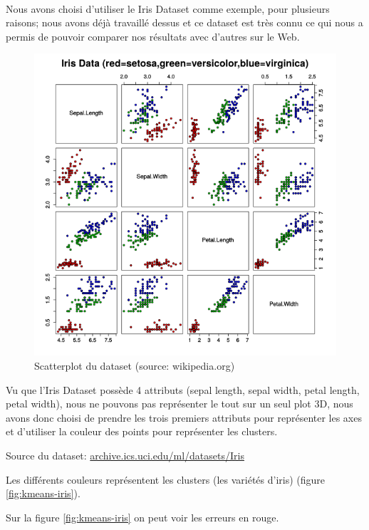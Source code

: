 \documentclass{article}
\begin{document}
  \

  Nous avons choisi d'utiliser le Iris Dataset comme exemple, pour plusieurs raisons;
  nous avons déjà travaillé dessus et ce dataset est très connu ce qui nous a permis de
  pouvoir comparer nos résultats avec d'autres sur le Web.

  \begin{figure}[h]
    \centering
    \includegraphics[scale=0.5]{images/Iris_dataset_scatterplot.png}
    \caption{Scatterplot du dataset (source: wikipedia.org)}
    \label{fig:scatterplot-wiki}
  \end{figure}



  Vu que l'Iris Dataset possède 4 attributs (sepal length, sepal width, petal length, petal width),
  nous ne pouvons pas représenter le tout sur un seul plot 3D, nous avons donc choisi de prendre les trois premiers attributs
  pour représenter les axes
  et d'utiliser la couleur des points pour représenter les clusters.

  Source du dataset: \url{archive.ics.uci.edu/ml/datasets/Iris}

  \newpage
  Les différents couleurs représentent les clusters (les variétés d'iris) (figure \ref{fig:kmeans-iris}).

  Sur la figure \ref{fig:kmeans-iris} on peut voir les erreurs en rouge.
\end{document}
